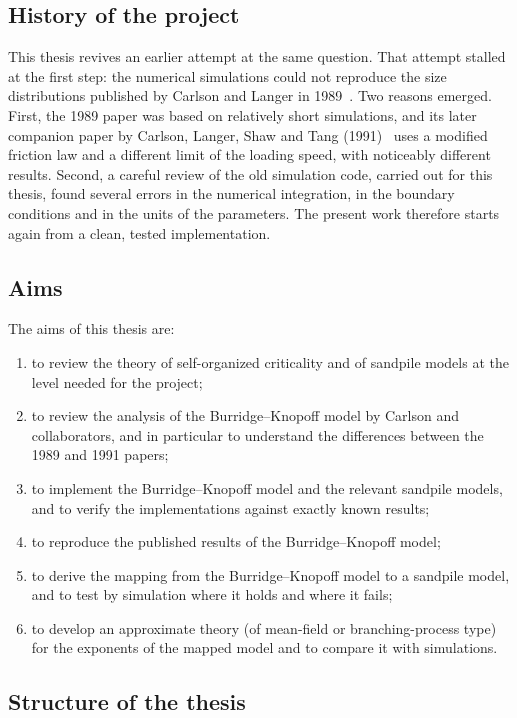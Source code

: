 \subsection{History of the project}

This thesis revives an earlier attempt at the same question. That attempt stalled at the first step: the
numerical simulations could not reproduce the size distributions published by Carlson and
Langer in 1989~\cite{CarlsonLanger1989}. Two reasons emerged. First, the 1989 paper was based on relatively
short simulations, and its later companion paper by Carlson, Langer, Shaw and Tang (1991)~\cite{Carlson1991}
uses a modified friction law and a different limit of the loading speed, with noticeably different results.
Second, a careful review of the old simulation code, carried out for this thesis, found several errors in
the numerical integration, in the boundary conditions and in the units of the parameters. The present work
therefore starts again from a clean, tested implementation.

\subsection{Aims}

The aims of this thesis are:
\begin{enumerate}[nosep]
  \item to review the theory of self-organized criticality and of sandpile models at the level needed for the
    project;
  \item to review the analysis of the Burridge--Knopoff model by Carlson and collaborators, and in particular
    to understand the differences between the 1989 and 1991 papers;
  \item to implement the Burridge--Knopoff model and the relevant sandpile models, and to verify the
    implementations against exactly known results;
  \item to reproduce the published results of the Burridge--Knopoff model;
  \item to derive the mapping from the Burridge--Knopoff model to a sandpile model, and to test by simulation
    where it holds and where it fails;
  \item to develop an approximate theory (of mean-field or branching-process type) for the exponents of the
    mapped model and to compare it with simulations.
\end{enumerate}

\subsection{Structure of the thesis}

